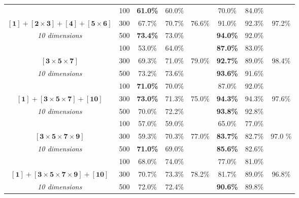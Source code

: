 \documentclass[a4paper,12pt ]{report}
\begin{document}
\begin{table}[h]
\begin{center}
{\begin{tabular}{|c |  c | c | r c  | c | c c | }
 &100 & \textbf{61.0\%} & 	60.0\% & 	 &  70.0\% & 	84.0\% & \\ 
$\bm{{[1]} + {[2\times 3]} + {[4]} + {[5\times 6]}  } $ & 300 & 67.7\% & 	70.7\% &  76.6\% &  91.0\% & 	92.3\% & 97.2\% \\ 
\emph{10 dimensions}& 500 & \textbf{73.4\%} & 	73.0\% & 	 &  \textbf{94.0\%} & 	92.0\% &  \\  \hline


&100 &  53.0\% & 64.0\% & & \textbf{87.0\%} & 83.0\% &  \\ 
$\bm{{[3\times5\times7]}} $ & 300 & 69.3\% & 71.0\% & 79.0\% & \textbf{92.7\%} & 89.0\% & 98.4\%  \\ 
\emph{10 dimensions}& 500 & {73.2\%} & 73.6\% & & \textbf{93.6\%} & 91.6\% &  \\    \hline


 &100 & \textbf{71.0\%}  & 70.0\% & 	& 87.0\% & 92.0\% & \\  
$\bm{{[1]} + {[3\times5\times7]}  +  {[10]}} $ & 300 & \textbf{73.0\%}  & 71.3\% & 75.0\% & \textbf{94.3\%} & 94.3\% & 97.6\% \\ 
\emph{10 dimensions}& 500 &  70.0\%  & 72.2\% & 	& \textbf{93.8\%} & 92.8\% & \\ \hline


&100 & 57.0\% & 59.0\% &  &	65.0\% & 77.0\% & \\ 
$\bm{{[3\times5\times7\times9]}} $ & 300 & 59.3\% & 70.3\% & 77.0\% &    \textbf{83.7\%} & 82.7\% & 97.0 \% \\ 
\emph{10 dimensions}& 500 & \textbf{71.0\%} & 	69.0\% & & \textbf{85.6\%} & 82.6\% & \\   \hline


 &100 & 68.0\% & 74.0\% &  & 77.0\% & 	81.0\% &  \\ 
$\bm{ {[1]} + {[3\times 5\times 7\times 9]}  + {[10]} }$  & 300 & 70.7\% & 73.3\% & 78.2\% & 81.7\% & 89.0\% &  96.8\% \\ 
\emph{10 dimensions} & 500 & 72.0\% & 72.4\% &  & \textbf{90.6\%} & 	89.8\% &  \\ 
 
\hline
\end{tabular}
}     

 \end{center}

\end{table}
\end{document}
